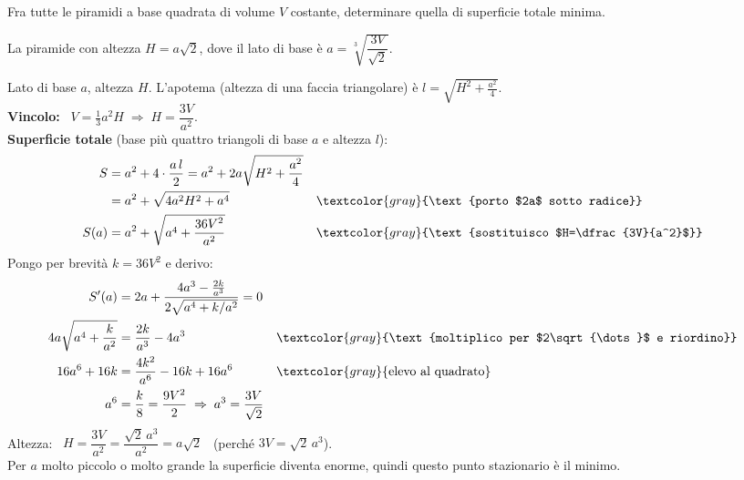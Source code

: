 \begin{question}[ID=2.3, subtitle={Piramide a base quadrata di minima superficie a volume fisso}, tags={ottimizzazione, geometria, solidi}, difficulty=difficile]
Fra tutte le piramidi a base quadrata di volume \(V\) costante, determinare quella di superficie totale minima.
\begin{solution}
La piramide con altezza $H=a\sqrt2$, dove il lato di base è $a=\sqrt[3]{\dfrac{3V}{\sqrt2}}$.
\end{solution}
\begin{explanation}
Lato di base $a$, altezza $H$. L'apotema (altezza di una faccia triangolare) è $l=\sqrt{H^2+\tfrac{a^2}{4}}$. \\
\textbf{Vincolo:} \ $V=\tfrac13a^2H \;\Rightarrow\; H=\dfrac{3V}{a^2}$. \\
\textbf{Superficie totale} (base più quattro triangoli di base $a$ e altezza $l$):
\[\begin{aligned}
S &= a^2+4\cdot\dfrac{a\,l}{2}=a^2+2a\sqrt{H^2+\dfrac{a^2}{4}}\\
&= a^2+\sqrt{4a^2H^2+a^4} && \textcolor{gray}{\text{porto $2a$ sotto radice}}\\
S(a) &= a^2+\sqrt{a^4+\dfrac{36V^2}{a^2}} && \textcolor{gray}{\text{sostituisco $H=\dfrac{3V}{a^2}$}}
\end{aligned}\]
Pongo per brevità $k=36V^2$ e derivo:
\[\begin{aligned}
S'(a) &= 2a+\dfrac{4a^3-\frac{2k}{a^3}}{2\sqrt{a^4+k/a^2}}=0\\
4a\sqrt{a^4+\dfrac{k}{a^2}} &= \dfrac{2k}{a^3}-4a^3 && \textcolor{gray}{\text{moltiplico per $2\sqrt{\dots}$ e riordino}}\\
16a^6+16k &= \dfrac{4k^2}{a^6}-16k+16a^6 && \textcolor{gray}{\text{elevo al quadrato}}\\
a^6 &= \dfrac{k}{8}=\dfrac{9V^2}{2} \;\Rightarrow\; a^3=\dfrac{3V}{\sqrt2}
\end{aligned}\]
Altezza: \ $H=\dfrac{3V}{a^2}=\dfrac{\sqrt2\,a^3}{a^2}=a\sqrt2$ \ (perché $3V=\sqrt2\,a^3$). \\
Per $a$ molto piccolo o molto grande la superficie diventa enorme, quindi questo punto stazionario è il minimo.
\end{explanation}
\end{question}


